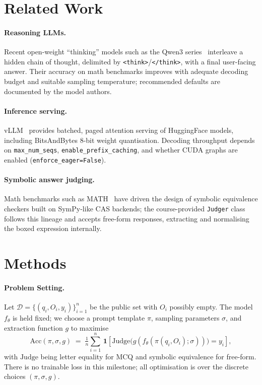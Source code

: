 \documentclass{article}
\begin{document}
\section{Related Work}
\label{sec:relatedwork}

\paragraph{Reasoning LLMs.} Recent open-weight ``thinking'' models such as the
Qwen3 series~\citep{qwen3} interleave a hidden chain of thought, delimited by
\texttt{<think>}/\texttt{</think>}, with a final user-facing answer. Their
accuracy on math benchmarks improves with adequate decoding budget and
suitable sampling temperature; recommended defaults are documented by the
model authors.

\paragraph{Inference serving.} vLLM~\citep{vllm} provides batched, paged
attention serving of HuggingFace models, including BitsAndBytes 8-bit weight
quantisation. Decoding throughput depends on \texttt{max\_num\_seqs},
\texttt{enable\_prefix\_caching}, and whether CUDA graphs are enabled
(\texttt{enforce\_eager=False}).

\paragraph{Symbolic answer judging.} Math benchmarks such as
MATH~\citep{hendrycks2021math} have driven the design of symbolic equivalence
checkers built on SymPy-like CAS backends; the course-provided
\texttt{Judger} class follows this lineage and accepts free-form responses,
extracting and normalising the boxed expression internally.


\section{Methods}
\label{sec:methods}

\paragraph{Problem Setting.}
Let $\mathcal{D}=\{(q_i,O_i,y_i)\}_{i=1}^{n}$ be the public set with $O_i$
possibly empty. The model $f_\theta$ is held fixed; we choose a prompt template
$\pi$, sampling parameters $\sigma$, and extraction function $g$ to maximise
\[
  \mathrm{Acc}(\pi,\sigma,g) \;=\; \tfrac{1}{n}\sum_{i=1}^{n}\,
    \mathbf{1}\!\left[\mathrm{Judge}\bigl(g(f_\theta(\pi(q_i,O_i);\sigma))\bigr) = y_i\right],
\]
with $\mathrm{Judge}$ being letter equality for MCQ and symbolic equivalence
for free-form. There is no trainable loss in this milestone; all optimisation
is over the discrete choices $(\pi,\sigma,g)$.
\end{document}
